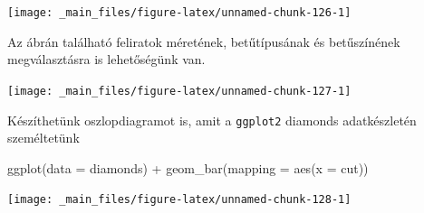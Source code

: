 \documentclass[
]{book}
\newenvironment{Shaded}{\begin{snugshade}}{\end{snugshade}}
\newcommand{\AttributeTok}[1]{\textcolor[rgb]{0.77,0.63,0.00}{#1}}
\newcommand{\DecValTok}[1]{\textcolor[rgb]{0.00,0.00,0.81}{#1}}
\newcommand{\FunctionTok}[1]{\textcolor[rgb]{0.00,0.00,0.00}{#1}}
\newcommand{\NormalTok}[1]{#1}
\newcommand{\SpecialCharTok}[1]{\textcolor[rgb]{0.00,0.00,0.00}{#1}}
\newcommand{\StringTok}[1]{\textcolor[rgb]{0.31,0.60,0.02}{#1}}
\begin{document}
\begin{center}\texttt{[image: \_main\_files/figure-latex/unnamed-chunk-126-1]} \end{center}

Az ábrán található feliratok méretének, betűtípusának és betűszínének
megválasztásra is lehetőségünk van.

\begin{Shaded}
\end{Shaded}

\begin{center}\texttt{[image: \_main\_files/figure-latex/unnamed-chunk-127-1]} \end{center}

Készíthetünk oszlopdiagramot is, amit a \texttt{ggplot2} diamonds
adatkészletén személtetünk

\begin{Shaded}
\begin{Highlighting}[]
\FunctionTok{ggplot}\NormalTok{(}\AttributeTok{data =}\NormalTok{ diamonds) }\SpecialCharTok{+}
  \FunctionTok{geom\_bar}\NormalTok{(}\AttributeTok{mapping =} \FunctionTok{aes}\NormalTok{(}\AttributeTok{x =}\NormalTok{ cut))}
\end{Highlighting}
\end{Shaded}

\begin{center}\texttt{[image: \_main\_files/figure-latex/unnamed-chunk-128-1]} \end{center}
\end{document}

